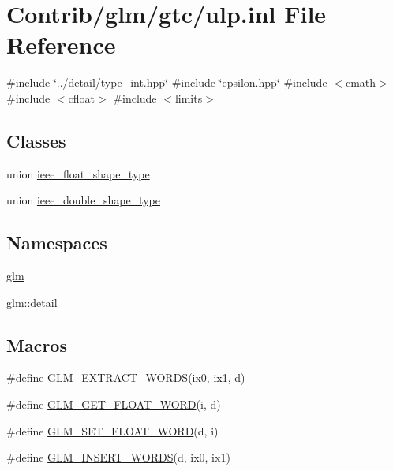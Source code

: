 \hypertarget{ulp_8inl}{}\section{Contrib/glm/gtc/ulp.inl File Reference}
\label{ulp_8inl}
{\ttfamily \#include \char`\"{}../detail/type\+\_\+int.\+hpp\char`\"{}}\newline
{\ttfamily \#include \char`\"{}epsilon.\+hpp\char`\"{}}\newline
{\ttfamily \#include $<$cmath$>$}\newline
{\ttfamily \#include $<$cfloat$>$}\newline
{\ttfamily \#include $<$limits$>$}\newline
\subsection*{Classes}
\begin{DoxyCompactItemize}
\item 
union \mbox{\hyperlink{unionieee__float__shape__type}{ieee\+\_\+float\+\_\+shape\+\_\+type}}
\item 
union \mbox{\hyperlink{unionieee__double__shape__type}{ieee\+\_\+double\+\_\+shape\+\_\+type}}
\end{DoxyCompactItemize}
\subsection*{Namespaces}
\begin{DoxyCompactItemize}
\item 
 \mbox{\hyperlink{namespaceglm}{glm}}
\item 
 \mbox{\hyperlink{namespaceglm_1_1detail}{glm\+::detail}}
\end{DoxyCompactItemize}
\subsection*{Macros}
\begin{DoxyCompactItemize}
\item 
\#define \mbox{\hyperlink{ulp_8inl_a037d712bb7eec79dcd0073eb07d3f3e8}{G\+L\+M\+\_\+\+E\+X\+T\+R\+A\+C\+T\+\_\+\+W\+O\+R\+DS}}(ix0,  ix1,  d)
\item 
\#define \mbox{\hyperlink{ulp_8inl_a28d9056369280955e923f99180ccb23c}{G\+L\+M\+\_\+\+G\+E\+T\+\_\+\+F\+L\+O\+A\+T\+\_\+\+W\+O\+RD}}(i,  d)
\item 
\#define \mbox{\hyperlink{ulp_8inl_ab01ab8df0632f4a5f05e00f570e6b873}{G\+L\+M\+\_\+\+S\+E\+T\+\_\+\+F\+L\+O\+A\+T\+\_\+\+W\+O\+RD}}(d,  i)
\item 
\#define \mbox{\hyperlink{ulp_8inl_ac4ec14cb5c94f0ca1d594457ee17636f}{G\+L\+M\+\_\+\+I\+N\+S\+E\+R\+T\+\_\+\+W\+O\+R\+DS}}(d,  ix0,  ix1)
\end{DoxyCompactItemize}
